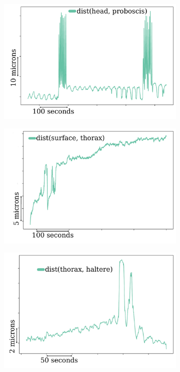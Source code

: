 \begin{figure}[ht!]
	\centering
	\begin{subfigure}[ht!]{0.333\linewidth}
		\centering\includegraphics[width=\linewidth]{figures/ExampleTrajectory-ProboscisPumping.pdf}
		\caption{}
	\end{subfigure}%
	\centering
	\begin{subfigure}[ht!]{0.333\linewidth}
		\centering\includegraphics[width=\linewidth]{figures/ExampleTrajectory-PosturalAdjustment.pdf}
		\caption{}
	\end{subfigure}%
	\centering
	\begin{subfigure}[ht!]{0.333\linewidth}
		\centering\includegraphics[width=\linewidth]{figures/ExampleTrajectory-HaltereSwitch_3.pdf}

\end{subfigure}
\end{figure}
